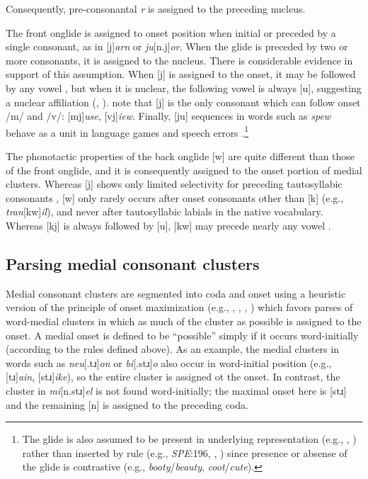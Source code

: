 \documentclass[12pt]{article}
\begin{document}
\noindent
Consequently, pre-consonantal \emph{r} is assigned to the preceding nucleus.

The front onglide is assigned to onset position when initial or preceded by a single consonant, as in [j]\emph{arn} or \emph{ju}[n.j]\emph{or}. When the glide is preceded by two or more consonants, it is assigned to the nucleus. There is considerable evidence in support of this assumption. When [j] is assigned to the onset, it may be followed by any vowel \citep[276]{Borowsky1986}, but when it is nuclear, the following vowel is always [u], suggesting a nuclear affiliation (\citealp[61f.]{Harris1994}, \citealp[232]{Hayes1980}). \citet[42]{Clements1983} note that [j] is the only consonant which can follow onset /m/ and /v/: [mj]\emph{use}, [vj]\emph{iew}. Finally, [ju] sequences in words such as \emph{spew} behave as a unit in language games \citep{Davis1995,Nevins2003} and speech errors \citep[130]{Shattuck-Hufnagel1986}.\footnote{The glide is also assumed to be present in underlying representation (e.g., \citealp{Anderson1988b}, \citealp[278]{Borowsky1986}) rather than inserted by rule (e.g., \emph{SPE}:196, \citealp[][89]{Halle1985a}, \citealp[][217]{McMahon1990}) since presence or absense of the glide is contrastive (e.g., \emph{booty}/\emph{beauty}, \emph{coot}/\emph{cute}).}

The phonotactic properties of the back onglide [w] are quite different than those of the front onglide, and it is consequently assigned to the onset portion of medial clusters. Whereas [j] shows only limited selectivity for preceding tautosyllabic consonants \citep{Kaye1996}, [w] only rarely occurs after onset consonants other than [k] (e.g., \emph{tran}[kw]\emph{il}), and never after tautosyllabic labials in the native vocabulary. Whereas [kj] is always followed by [u], [kw] may precede nearly any vowel \citep[161]{Davis1995}.

\subsection{Parsing medial consonant clusters}

Medial consonant clusters are segmented into coda and onset using a heuristic version of the principle of onset maximization (e.g., \citealp[42f.]{Kahn1976}, \citealp{Kurylowicz1948}, \citealp[75]{Pulgram1970}, \citealp[][358f.]{Selkirk1982b}) which favors parses of word-medial clusters in which as much of the cluster as possible is assigned to the onset. A medial onset is defined to be ``possible'' simply if it occurs word-initially (according to the rules defined above). As an example, the medial clusters in words such as \emph{neu}[.tɹ]\emph{on} or \emph{bi}[.stɹ]\emph{o} also occur in word-initial position (e.g., [tɹ]\emph{ain}, [stɹ]\emph{ike}), so the entire cluster is assigned ot the onset. In contrast, the cluster in \emph{mi}[n.stɹ]\emph{el} is not found word-initially; the maximal onset here is [stɹ] and the remaining [n] is assigned to the preceding coda.
\end{document}
